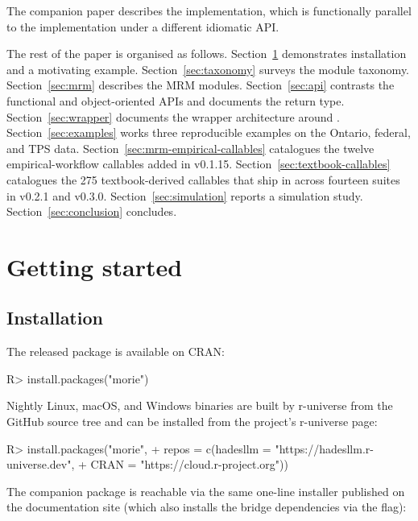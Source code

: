\documentclass[article,shortnames,nojss]{jss}
\begin{document}
The companion paper \citep{Ruhela2026MoriePy} describes the
 implementation, which is functionally parallel
to the  implementation under a different idiomatic
API.

The rest of the paper is organised as follows.
Section~\ref{sec:getting-started} demonstrates installation and a
motivating example. Section~\ref{sec:taxonomy} surveys the module
taxonomy. Section~\ref{sec:mrm} describes the MRM modules.
Section~\ref{sec:api} contrasts the functional and
object-oriented APIs and documents the 
return type.  Section~\ref{sec:wrapper} documents the wrapper architecture
around . Section~\ref{sec:examples} works three
reproducible examples on the Ontario, federal, and TPS data.
Section~\ref{sec:mrm-empirical-callables} catalogues the
twelve empirical-workflow callables added in v0.1.15.
Section~\ref{sec:textbook-callables} catalogues the 275
textbook-derived callables that ship in  across
fourteen suites in v0.2.1 and v0.3.0.
Section~\ref{sec:simulation} reports a simulation study.
Section~\ref{sec:conclusion} concludes.

\section{Getting started}
\label{sec:getting-started}

\subsection{Installation}

The released  package is available on CRAN:

\begin{Code}
R> install.packages("morie")
\end{Code}

\noindent Nightly Linux, macOS, and Windows binaries are built by
r-universe \citep{Ooms2021runiverse} from the GitHub source tree
and can be installed from the project's r-universe page:

\begin{Code}
R> install.packages("morie",
+   repos = c(hadesllm = "https://hadesllm.r-universe.dev",
+             CRAN     = "https://cloud.r-project.org"))
\end{Code}

\noindent The companion  package is reachable via
the same one-line installer published on the documentation site
(which also installs the  bridge dependencies via the
 flag):
\end{document}
